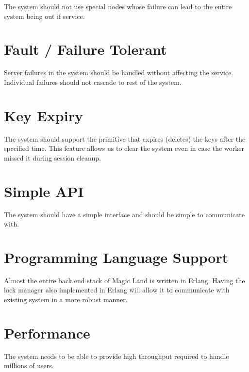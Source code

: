 
The system should not use special nodes whose failure can lead to the
entire system being out if service.

\section{Fault / Failure Tolerant}


Server failures in the system should be handled without affecting the service.
Individual failures should not cascade to rest of the system.

\section{Key Expiry}


The system should support the primitive that expires (deletes) the keys after
the specified time. This feature allows us to clear the system even in case
the worker missed it during session cleanup.

\section{Simple API}


The system should have a simple interface and should be simple to communicate
with.

\section{Programming Language Support}


Almost the entire back end stack of Magic Land is written in Erlang. Having the
lock manager also implemented in Erlang will allow it to communicate with
existing system in a more robust manner.

\section{Performance}


The system needs to be able to provide high throughput required to handle
millions of users.

